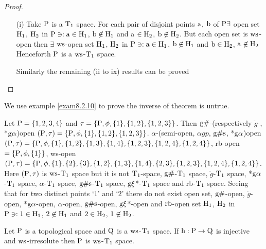 \begin{proof}
\begin{itemize}
\item[(i)] Take $\mathrm{P}$ is a $\mathrm{T}_{1}$ space. For each pair of disjoint points $\mathrm{a}$, $\mathrm{b}$ of $\mathrm{P} \exists$  open set $\mathrm{H}_{1}$, $\mathrm{H}_{2}$ in $\mathrm{P} \ni: \mathrm{a} \in \mathrm{H}_{1}$, $\mathrm{b} \not\in \mathrm{H}_{1}$ and a $\in \mathrm{H}_{2}$, $\mathrm{b} \not\in \mathrm{H}_{2}$. But each open set is $\mathrm{ws}$-open then $\exists$  $\mathrm{ws}$-open set $\mathrm{H}_{1}$, $\mathrm{H}_{2}$ in $\mathrm{P} \ni: \mathrm{a} \in \mathrm{H}_{1}$, $\mathrm{b} \not\in \mathrm{H}_{1}$ and $\mathrm{b} \in \mathrm{H}_{2}$, $\mathrm{a} \not\in \mathrm{H}_{2}$ Henceforth $\mathrm{P}$ is a $\mathrm{ws}$-$\mathrm{T}_{1}$ space.

Similarly the remaining (ii to ix) results can be proved
\end{itemize}
\end{proof}

We use example \ref{exam8.2.10} to prove the inverse of theorem is untrue.

\begin{exm}\label{exam8.2.10}
Let $\mathrm{P}= \{1,2,3,4\}$ and $\tau =\{\mathrm{P}, \phi, \{1\}, \{1, 2\},\{1, 2, 3\}\}$. Then $\mathrm{g}\#$-(respectively $\ddot{g}$-, *$\mathrm{g}\alpha$)open $(\mathrm{P}, \tau)=\{\mathrm{P}, \phi, \{1\}, \{1,2\},\{1, 2 ,3\}\}$. $\alpha$-(semi-open, $\alpha gp$, $\mathrm{g}\#\mathrm{s}$, *$\mathrm{g}\alpha$)open $(\mathrm{P}, \tau)=\{\mathrm{P}, \phi, \{1\}, \{1, 2\},\{1, 3\},\{1, 4\},\{1, 2, 3\},\{1, 2, 4\},\{1, 2, 4\}\}$, rb-open$=\{\mathrm{P}, \phi, \{1\}\}$, ws-open $(\TSP, \tau)=\{\TSP, \phi, \{1\},\{2\},\{3\},\{1, 2\},\{1, 3\},\{1, 4\},\break \{2 ,3\},\{1, 2, 3\},\{1, 2, 4\},\{1, 2, 4\}\}$. Here $(\mathrm{P}, \tau)$ is $\mathrm{ws}$-$\mathrm{T}_{1}$ space but it is not $\mathrm{T}_{1}$-space, $\mathrm{g}\#$-$\mathrm{T}_{1}$ space, $\ddot{g}$-$\mathrm{T}_{1}$ space, *$\mathrm{g}\alpha$-$\mathrm{T}_{1}$ space, $\alpha$-$\mathrm{T}_{1}$ space, $\mathrm{g}\#\mathrm{s}$-$\mathrm{T}_{1}$ space, $\mathrm{g}\xi$*-$\mathrm{T}_{1}$ space and rb-$\mathrm{T}_{1}$ space. Seeing that for two distinct points `$1$' and `$2$' there do not exist open set, $\mathrm{g}\#$-open, $\ddot{g}$-open, *$\mathrm{g}\alpha$-open, $\alpha$-open, $\mathrm{g}\#\mathrm{s}$-open, $\mathrm{g}\xi$*-open and $\mathrm{rb}$-open set $\mathrm{H}_{1}$, $\mathrm{H}_{2}$ in $\mathrm{P} \ni: 1 \in \mathrm{H}_{1}$, $2 \not\in \mathrm{H}_{1}$ and $2 \in \mathrm{H}_{2}$, $1 \not\in \mathrm{H}_{2}$.
\end{exm}

\begin{thm}\label{thm8.2.11}
Let $\mathrm{P}$ is a topological space and $\mathrm{Q}$ is a $\mathrm{ws}$-$\mathrm{T}_{1}$ space. If $\mathrm{h}: \mathrm{P} \to \mathrm{Q}$ is injective and $\mathrm{ws}$-irresolute then $\mathrm{P}$ is $\mathrm{ws}$-$\mathrm{T}_{1}$ space.
\end{thm}

